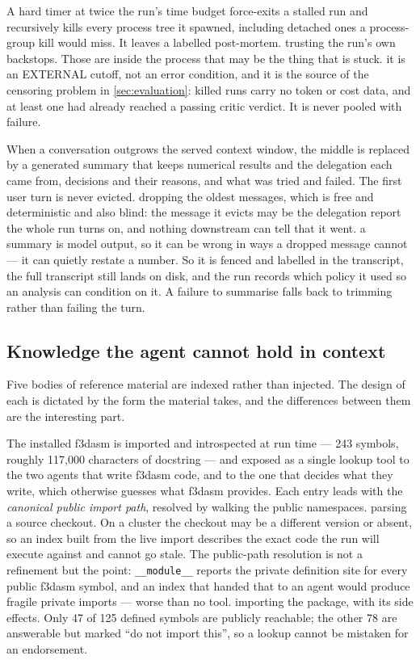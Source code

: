 {A hard timer at twice the run's time budget force-exits a stalled run and
recursively kills every process tree it spawned, including detached ones a
process-group kill would miss. It leaves a labelled post-mortem.}
{trusting the run's own backstops. Those are inside the process that may be the
thing that is stuck.}
{it is an EXTERNAL cutoff, not an error condition, and it is the source of the
censoring problem in \cref{sec:evaluation}: killed runs carry no token or cost
data, and at least one had already reached a passing critic verdict. It is
never pooled with failure.}

{When a conversation outgrows the served context window, the middle is replaced
by a generated summary that keeps numerical results and the delegation each came
from, decisions and their reasons, and what was tried and failed. The first user
turn is never evicted.}
{dropping the oldest messages, which is free and deterministic and also blind:
the message it evicts may be the delegation report the whole run turns on, and
nothing downstream can tell that it went.}
{a summary is model output, so it can be wrong in ways a dropped message cannot
--- it can quietly restate a number. So it is fenced and labelled in the
transcript, the full transcript still lands on disk, and the run records which
policy it used so an analysis can condition on it. A failure to summarise falls
back to trimming rather than failing the turn.}

\subsection{Knowledge the agent cannot hold in context}
\label{sec:knowledge}

Five bodies of reference material are indexed rather than injected. The design
of each is dictated by the form the material takes, and the differences between
them are the interesting part.

{The installed f3dasm is imported and introspected at run time --- 243 symbols,
roughly 117{,}000 characters of docstring --- and exposed as a single lookup
tool to the two agents that write f3dasm code, and to the one that decides
what they write, which otherwise guesses what f3dasm provides. Each entry leads with the
\emph{canonical public import path}, resolved by walking the public
namespaces.}
{parsing a source checkout. On a cluster the checkout may be a different
version or absent, so an index built from the live import describes the exact
code the run will execute against and cannot go stale. The public-path
resolution is not a refinement but the point: \texttt{\_\_module\_\_} reports
the private definition site for every public f3dasm symbol, and an index that
handed that to an agent would produce fragile private imports --- worse than no
tool.}
{importing the package, with its side effects. Only 47 of 125 defined symbols
are publicly reachable; the other 78 are answerable but marked ``do not import
this'', so a lookup cannot be mistaken for an endorsement.}


